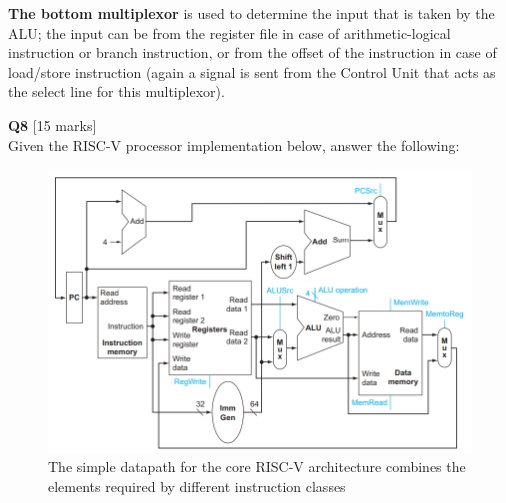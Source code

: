 \documentclass[addpoints]{exam}
\begin{document}
\begin{sloppypar}
\begin{questions}
\begin{solution}
\begin{parts}
            \textbf{The bottom multiplexor} is used to determine the input that is taken by the ALU; the input can be from the register file in case of arithmetic-logical instruction or branch instruction, or from the offset of the instruction in case of load/store instruction (again a signal is sent from the Control Unit that acts as the select line for this multiplexor).
        \end{parts}
    \end{solution}
\pagebreak
    \question[15]\textbf{Q8} [15 marks] \\ 
    Given the RISC-V processor implementation below, answer the following:
    \begin{figure}[h]
        \begin{center}
            \includegraphics[scale = 0.5]{q8_fig.png}
            \caption{The simple datapath for the core RISC-V architecture combines the elements
            required by different instruction classes}
        \end{center}
    \end{figure}
\end{questions}
\end{sloppypar}
\end{document}
